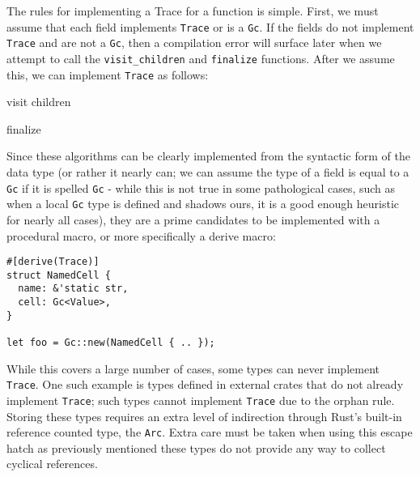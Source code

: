 \documentclass[sigplan,review,anonymous]{acmart}
\begin{document}
The rules for implementing a Trace for a function is simple. First, we must
assume that each field implements \texttt{Trace} or is a \texttt{Gc}. If the
fields do not implement \texttt{Trace} and are not a \texttt{Gc}, then a
compilation error will surface later when we attempt to call the
\texttt{visit\_children} and \texttt{finalize} functions. After we assume this,
we can implement \texttt{Trace} as follows:

\begin{algorithm}
  \caption{visit children}\label{alg:cap}

\end{algorithm}

\begin{algorithm}
  \caption{finalize}\label{alg:cap}

\end{algorithm}

Since these algorithms can be clearly implemented from the syntactic form of the
data type (or rather it nearly can; we can assume the type of a field is equal to
a \texttt{Gc} if it is spelled \texttt{Gc} - while this is not true in some
pathological cases, such as when a local \texttt{Gc} type is defined and shadows
ours, it is a good enough heuristic for nearly all cases), they are a prime
candidates to be implemented with a procedural macro, or more specifically a
derive macro\cite{derive}:

\begin{verbatim}
#[derive(Trace)]
struct NamedCell {
  name: &'static str,
  cell: Gc<Value>,
}

let foo = Gc::new(NamedCell { .. });
\end{verbatim}

While this covers a large number of cases, some types can never implement
\texttt{Trace}. One such example is types defined in external crates that do not
already implement \texttt{Trace}; such types cannot implement \texttt{Trace} due
to the orphan rule\cite{orphan}. Storing these types requires an extra level of
indirection through Rust's built-in reference counted type, the
\texttt{Arc}. Extra care must be taken when using this escape hatch as
previously mentioned these types do not provide any way to collect cyclical
references.
\end{document}
